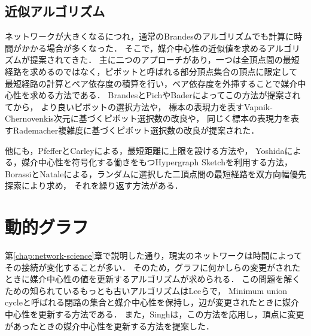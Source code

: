\subsection{近似アルゴリズム}
ネットワークが大きくなるにつれ，通常のBrandesのアルゴリズムでも計算に時間がかかる場合が多くなった．
そこで，媒介中心性の近似値を求めるアルゴリズムが提案されてきた．
主に二つのアプローチがあり，一つは全頂点間の最短経路を求めるのではなく，ピボットと呼ばれる部分頂点集合の頂点に限定して
最短経路の計算とペア依存度の積算を行い，ペア依存度を外挿することで媒介中心性を求める方法である\cite{Brandes2007}．
BrandesとPich\cite{Brandes2007}やBader\cite{Bader2007}によってこの方法が提案されてから，
より良いピボットの選択方法\cite{Geisberger2008,Chehreghani2014}や，
標本の表現力を表すVapnik-Chernovenkis次元に基づくピボット選択数の改良\cite{Riondato2014}や，
同じく標本の表現力を表すRademacher複雑度に基づくピボット選択数の改良\cite{Riondato2016}が提案された．

他にも，PfefferとCarleyによる，最短距離に上限を設ける方法\cite{Pfeffer2012}や，
Yoshidaによる，媒介中心性を符号化する働きをもつHypergraph Sketchを利用する方法\cite{Yoshida2014}，
BorassiとNataleによる，ランダムに選択した二頂点間の最短経路を双方向幅優先探索により求め，
それを繰り返す方法\cite{Borassi2019}がある．

\section{動的グラフ}
第\ref{chap:network-science}章で説明した通り，現実のネットワークは時間によってその接続が変化することが多い．
そのため，グラフに何かしらの変更がされたときに媒介中心性の値を更新するアルゴリズムが求められる．
この問題を解くための知られているもっとも古いアルゴリズムはLeeら\cite{Lee2012}で，
Minimum union cycleと呼ばれる閉路の集合と媒介中心性を保持し，辺が変更されたときに媒介中心性を更新する方法である．
また，Singh\cite{Singh2015}は，この方法を応用し，頂点に変更があったときの媒介中心性を更新する方法を提案した．


